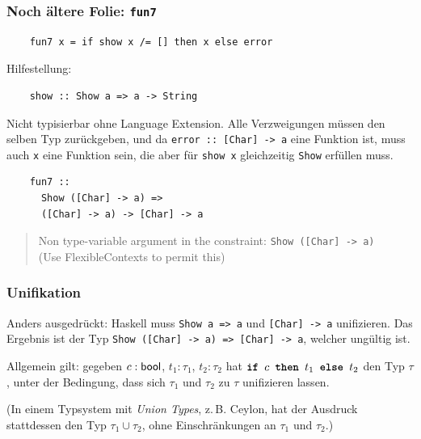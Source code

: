 \documentclass{beamer}
\begin{document}
\begin{frame}[fragile]\lstset{language=Haskell}
  \frametitle{Noch ältere Folie: \lstinline{fun7}}
  \begin{lstlisting}
    fun7 x = if show x /= [] then x else error
  \end{lstlisting}
  Hilfestellung:
  \begin{lstlisting}
    show :: Show a => a -> String
  \end{lstlisting}
  Nicht typisierbar ohne Language Extension.
  Alle Verzweigungen müssen den selben Typ zurückgeben,
  und da \lstinline{error :: [Char] -> a} eine Funktion ist,
  muss auch \lstinline{x} eine Funktion sein,
  die aber für \lstinline{show x} gleichzeitig \lstinline{Show} erfüllen muss.
  \begin{lstlisting}
    fun7 ::
      Show ([Char] -> a) =>
      ([Char] -> a) -> [Char] -> a
  \end{lstlisting}
  \begin{quote}
    Non type-variable argument in the constraint: \lstinline{Show ([Char] -> a)} \\
    (Use FlexibleContexts to permit this)
  \end{quote}
\end{frame}

\begin{frame}\lstset{language=Haskell}
  \frametitle{Unifikation}
  Anders ausgedrückt: Haskell muss \lstinline{Show a => a} und \lstinline{[Char] -> a} unifizieren.
  Das Ergebnis ist der Typ \lstinline{Show ([Char] -> a) => [Char] -> a}, welcher ungültig ist.
  
  \pause
  Allgemein gilt: gegeben $c: \textsf{bool}$, $t_1: τ_1$, $t_2: τ_2$ hat $\textbf{\texttt{if }} c \textbf{\texttt{ then }} t_1 \textbf{\texttt{ else }} t_2$ den Typ $τ$,
  unter der Bedingung, dass sich $τ_1$ und $τ_2$ zu $τ$ unifizieren lassen.
  
  \pause
  (In einem Typsystem mit \emph{Union Types}, z.\,B. Ceylon,
  hat der Ausdruck stattdessen den Typ $τ_1 \cup τ_2$,
  ohne Einschränkungen an $τ_1$ und $τ_2$.)
\end{frame}
\end{document}
